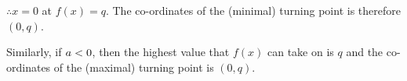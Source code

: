     
          
          \label{m39345*id244283}\begin{math}\therefore \end{math}\begin{math}x=0\end{math} at \begin{math}f\left(x\right)=q\end{math}. The co-ordinates of the (minimal) turning point is therefore \begin{math}\left(0,q\right)\end{math}.\par 
          \label{m39345*id244351}Similarly, if \begin{math}a<{}0\end{math}, then the highest value that \begin{math}f\left(x\right)\end{math} can take on is \begin{math}q\end{math} and the co-ordinates of the (maximal) turning point is \begin{math}\left(0,q\right)\end{math}.\par 
        
